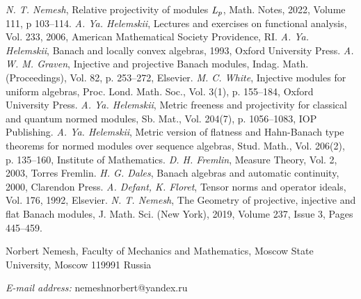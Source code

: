 \documentclass[12pt]{article}
\begin{document}
\begin{thebibliography}{999}
    \textit{N. T. Nemesh}, Relative projectivity of 
    modules $\it{L_p}$, Math. Notes, 2022, Volume 111, p 103--114.
    \textit{A. Ya. Helemskii}, Lectures and 
    exercises on functional analysis, Vol. 233, {2006}, 
    American Mathematical Society Providence, RI.
    \textit{A. Ya. Helemskii}, Banach and locally 
    convex algebras, {1993}, Oxford University Press.
    \textit{A. W. M. Graven}, Injective and 
    projective Banach modules, Indag. Math. (Proceedings), Vol. 82, p. 253--272,
    Elsevier.
    \textit{M. C. White}, Injective modules for uniform 
    algebras, Proc. Lond. Math. Soc., Vol. 3(1), p. 155--184, Oxford University 
    Press.
    \textit{A. Ya. Helemskii}, Metric freeness and 
    projectivity for classical and quantum normed modules, Sb. Mat., 
    Vol. 204(7), p. 1056--1083, IOP Publishing.
    \textit{A. Ya. Helemskii}, Metric version of 
    flatness and Hahn-Banach type theorems for normed modules over sequence 
    algebras, Stud. Math., Vol. 206(2), p. 135--160, Institute of Mathematics.
    \textit{D. H. Fremlin}, Measure Theory, Vol. 2,
    {2003}, Torres Fremlin.
    \textit{H. G. Dales}, Banach algebras and 
    automatic continuity, {2000}, Clarendon Press.
    \textit{A. Defant, K. Floret}, Tensor norms and 
    operator ideals, Vol. 176, {1992}, Elsevier.
    \textit{N. T. Nemesh}, The Geometry of 
    projective, injective and flat Banach modules, J. Math. Sci. (New York), 
    2019, Volume 237, Issue 3, Pages 445–459.
\end{thebibliography}

Norbert Nemesh, Faculty of Mechanics and Mathematics, Moscow State University,
Moscow 119991 Russia

\textit{E-mail address:} nemeshnorbert@yandex.ru
\end{document}
